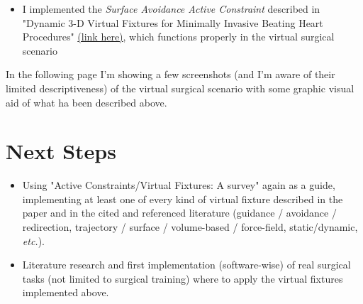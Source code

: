\documentclass{article}
\begin{document}
\begin{itemize}
\begin{itemize}
            \item 
            I implemented the \textit{Surface Avoidance Active
            Constraint} described in "Dynamic 3-D Virtual Fixtures for Minimally
            Invasive Beating Heart Procedures"
            \href{https://ieeexplore.ieee.org/document/4579344}{(link here)},
            which functions properly in the virtual surgical scenario 
        \end{itemize}
    \end{itemize}
    In the following page I'm showing a few screenshots (and I'm aware of
    their limited descriptiveness) of the virtual surgical scenario with some
    graphic visual aid of what ha been described above.  

\section*{Next Steps}
\begin{itemize}
    \item
    Using "Active Constraints/Virtual Fixtures: A survey" again as a guide,    
    implementing at least one of every kind of virtual fixture described in the
    paper and in the cited and referenced literature (guidance / avoidance / redirection,
    trajectory / surface / volume-based / force-field, static/dynamic, \textit{etc.}).
    \item 
    Literature research and first implementation (software-wise) of real
    surgical tasks (not limited to surgical training) where to apply the virtual
    fixtures implemented above. 
\end{itemize}
    
\end{document}
